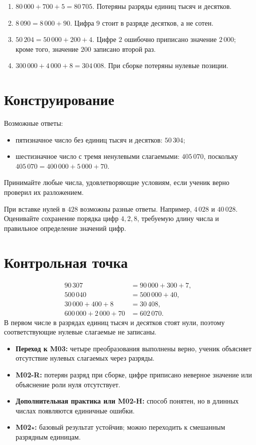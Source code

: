 \begin{enumerate}
  \item \(80\,000+700+5=80\,705\). Потеряны разряды единиц тысяч и десятков.
  \item \(8\,090=8\,000+90\). Цифра \(9\) стоит в разряде десятков, а не сотен.
  \item \(50\,204=50\,000+200+4\). Цифре \(2\) ошибочно приписано значение
    \(2\,000\); кроме того, значение \(200\) записано второй раз.
  \item \(300\,000+4\,000+8=304\,008\). При сборке потеряны нулевые позиции.
\end{enumerate}

\section{Конструирование}

Возможные ответы:
\begin{itemize}
  \item пятизначное число без единиц тысяч и десятков: \(50\,304\);
  \item шестизначное число с тремя ненулевыми слагаемыми: \(405\,070\),
    поскольку \(405\,070=400\,000+5\,000+70\).
\end{itemize}
Принимайте любые числа, удовлетворяющие условиям, если ученик верно проверил
их разложением.

При вставке нулей в \(428\) возможны разные ответы. Например, \(4\,028\) и
\(40\,028\). Оценивайте сохранение порядка цифр \(4,2,8\), требуемую длину
числа и правильное определение значений цифр.

\section{Контрольная точка}

\begin{align*}
  90\,307&=90\,000+300+7,\\
  500\,040&=500\,000+40,\\
  30\,000+400+8&=30\,408,\\
  600\,000+2\,000+70&=602\,070.
\end{align*}
В первом числе в разрядах единиц тысяч и десятков стоят нули, поэтому
соответствующие нулевые слагаемые не записаны.

\begin{resultbox}
  \begin{itemize}
    \item \textbf{Переход к M03:} четыре преобразования выполнены верно,
      ученик объясняет отсутствие нулевых слагаемых через разряды.
    \item \textbf{M02-R:} потерян разряд при сборке, цифре приписано неверное
      значение или объяснение роли нуля отсутствует.
    \item \textbf{Дополнительная практика или M02-H:} способ понятен, но в
      длинных числах появляются единичные ошибки.
    \item \textbf{M02\(\star\):} базовый результат устойчив; можно переходить к
      смешанным разрядным единицам.
  \end{itemize}
\end{resultbox}

